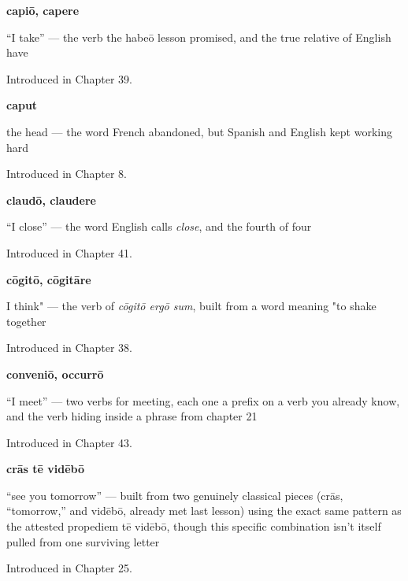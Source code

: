 \noindent\begin{minipage}[t]{\linewidth}
\raggedright
\textbf{capiō, capere}\par
\small \textquotedblleft{}I take\textquotedblright{} — the verb the habeō lesson promised, and the true relative of English have\par
\footnotesize Introduced in Chapter 39.
\end{minipage}\par\medskip

\noindent\begin{minipage}[t]{\linewidth}
\raggedright
\textbf{caput}\par
\small the head — the word French abandoned, but Spanish and English kept working hard\par
\footnotesize Introduced in Chapter 8.
\end{minipage}\par\medskip

\noindent\begin{minipage}[t]{\linewidth}
\raggedright
\textbf{claudō, claudere}\par
\small \textquotedblleft{}I close\textquotedblright{} — the word English calls \emph{close}, and the fourth of four\par
\footnotesize Introduced in Chapter 41.
\end{minipage}\par\medskip

\noindent\begin{minipage}[t]{\linewidth}
\raggedright
\textbf{cōgitō, cōgitāre}\par
\small I think" — the verb of \emph{cōgitō ergō sum}, built from a word meaning "to shake together\par
\footnotesize Introduced in Chapter 38.
\end{minipage}\par\medskip

\noindent\begin{minipage}[t]{\linewidth}
\raggedright
\textbf{conveniō, occurrō}\par
\small \textquotedblleft{}I meet\textquotedblright{} — two verbs for meeting, each one a prefix on a verb you already know, and the verb hiding inside a phrase from chapter 21\par
\footnotesize Introduced in Chapter 43.
\end{minipage}\par\medskip

\noindent\begin{minipage}[t]{\linewidth}
\raggedright
\textbf{crās tē vidēbō}\par
\small \textquotedblleft{}see you tomorrow\textquotedblright{} — built from two genuinely classical pieces (crās, \textquotedblleft{}tomorrow,\textquotedblright{} and vidēbō, already met last lesson) using the exact same pattern as the attested propediem tē vidēbō, though this specific combination isn't itself pulled from one surviving letter\par
\footnotesize Introduced in Chapter 25.
\end{minipage}\par\medskip

